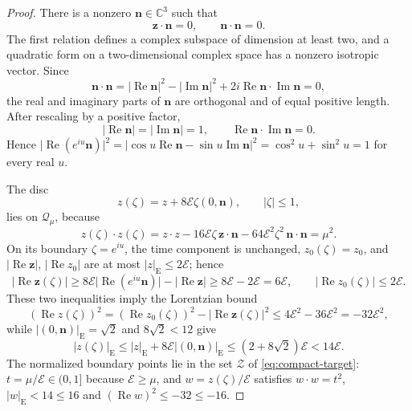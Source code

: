 \documentclass[11pt]{amsart}
\numberwithin{equation}{section}
\theoremstyle{definition}
\newcommand{\C}{\mathbb C}
\newcommand{\bz}{\mathbf z}
\newcommand{\Energy}{\mathcal E}
\newcommand{\Rea}{\operatorname{Re}}
\newcommand{\Ima}{\operatorname{Im}}
\begin{document}
\begin{proof}
There is a nonzero \(\mathbf n\in\C^3\) such that
\[
 \bz\cdot\mathbf n=0,\qquad \mathbf n\cdot\mathbf n=0.
\]
The first relation defines a complex subspace of dimension at least
two, and a quadratic form on a two-dimensional complex space has a
nonzero isotropic vector. Since
\[
 \mathbf n\cdot\mathbf n
 =\lvert\Rea\mathbf n\rvert^2-\lvert\Ima\mathbf n\rvert^2+2i\Rea\mathbf n\cdot\Ima\mathbf n
 =0,
\]
the real and imaginary parts of \(\mathbf n\) are orthogonal and of equal
positive length. After rescaling by a positive factor,
\[
 \lvert\Rea\mathbf n\rvert=\lvert\Ima\mathbf n\rvert=1,\qquad
 \Rea\mathbf n\cdot\Ima\mathbf n=0.
\]
Hence \(\lvert\Rea(e^{iu}\mathbf n)\rvert^2=\lvert\cos u\Rea\mathbf n-\sin u\Ima\mathbf n\rvert^2
=\cos^2u+\sin^2u=1\) for every real \(u\).

The disc
\[
 z(\zeta)=z+8\Energy\zeta(0,\mathbf n),\qquad |\zeta|\le1,
\]
lies on \(\mathcal Q_\mu\), because
\[
 z(\zeta)\cdot z(\zeta)
 =z\cdot z-16\Energy\zeta\,\bz\cdot\mathbf n
 -64\Energy^2\zeta^2\,\mathbf n\cdot\mathbf n
 =\mu^2.
\]
On its boundary \(\zeta=e^{iu}\), the time component is unchanged,
\(z_0(\zeta)=z_0\), and \(\lvert\Rea\bz\rvert\), \(\lvert\Rea z_0\rvert\) are at most
\(|z|_{\mathrm E}\le2\Energy\); hence
\[
 \lvert\Rea\bz(\zeta)\rvert\ge8\Energy\lvert\Rea(e^{iu}\mathbf n)\rvert-\lvert\Rea\bz\rvert
 \ge8\Energy-2\Energy=6\Energy,\qquad
 \lvert\Rea z_0(\zeta)\rvert\le2\Energy.
\]
These two inequalities imply the Lorentzian bound
\[
 (\Rea z(\zeta))^2=(\Rea z_0(\zeta))^2-\lvert\Rea\bz(\zeta)\rvert^2
 \le4\Energy^2-36\Energy^2=-32\Energy^2,
\]
while
\(|(0,\mathbf n)|_{\mathrm E}=\sqrt2\) and \(8\sqrt2<12\) give
\[
 |z(\zeta)|_{\mathrm E}
 \le|z|_{\mathrm E}+8\Energy|(0,\mathbf n)|_{\mathrm E}
 \le(2+8\sqrt2)\Energy<14\Energy.
\]
The normalized boundary points lie in the set \(\mathscr Z\) of
\eqref{eq:compact-target}: \(t=\mu/\Energy\in(0,1]\) because \(\Energy\ge\mu\), and
\(w=z(\zeta)/\Energy\) satisfies \(w\cdot w=t^2\),
\(|w|_{\mathrm E}<14\le16\) and \((\Rea w)^2\le-32\le-16\).
\end{proof}
\end{document}
